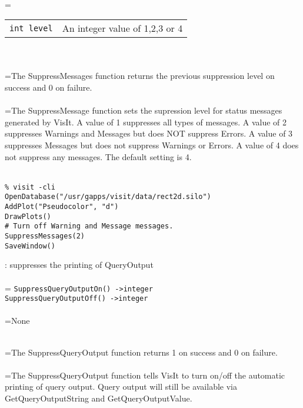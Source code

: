 \documentclass[10pt,a4paper]{report}
\begin{document}
 \\ 
\hangindent=\parindent 
\begin{tabular}{ll}
\verb!int level! & An integer value of 1,2,3 or 4 \\
\end{tabular} \\[-2mm]


 \\ 
\hangindent=\parindent The SuppressMessages function returns the previous suppression level on success and 0 on failure. \\[-3mm] 

 \\ 
\hangindent=\parindent The SuppressMessage function sets the supression level for status messages generated by VisIt.  A value of 1 suppresses all types of messages. A value of 2 suppresses Warnings and Messages but does NOT suppress Errors. A value of 3 suppresses Messages but does not suppress Warnings or Errors. A value of 4 does not suppress any messages. The default setting is 4. \\[-3mm] 

\\[-6mm]
\begin{verbatim}% visit -cli
OpenDatabase("/usr/gapps/visit/data/rect2d.silo")
AddPlot("Pseudocolor", "d")
DrawPlots()
# Turn off Warning and Message messages.
SuppressMessages(2)
SaveWindow()
\end{verbatim}
\newpage


{}
: suppresses the printing of QueryOutput\\[-3mm]

 \\ 
\hangindent=\parindent 
\verb!SuppressQueryOutputOn() ->integer!\\ 
\verb!SuppressQueryOutputOff() ->integer!\\ [-3mm]

 \\ 
\hangindent=\parindent None


 \\ 
\hangindent=\parindent The SuppressQueryOutput function returns 1 on success and 0 on failure. \\[-3mm] 

 \\ 
\hangindent=\parindent The SuppressQueryOutput function tells VisIt to turn on/off the automatic printing of query output.  Query output will still be available via  GetQueryOutputString and GetQueryOutputValue. \\[-3mm] 
\end{document}
